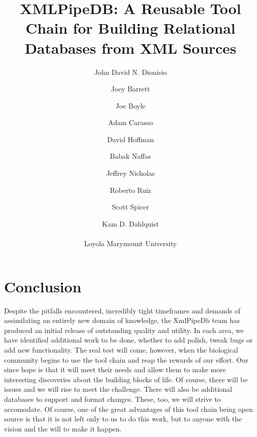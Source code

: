 \documentclass[11pt]{article}
\title{XMLPipeDB: A Reusable Tool Chain for Building Relational Databases from XML Sources}
\author{
John David N. Dionisio \and
Joey Barrett \and
Joe Boyle \and
Adam Carasso \and
David Hoffman \and
Babak Naffas \and
Jeffrey Nicholas \and
Roberto Ruiz \and
Scott Spicer \and
Kam D. Dahlquist\\
\\
Loyola Marymount University
}
\begin{document}
\maketitle




























\section{Conclusion}
Despite the pitfalls encountered, incredibly tight timeframes and demands of assimilating an entirely new domain of knowledge, the XmlPipeDb team has produced an initial release of outstanding quality and utility. In each area, we have identified additional work to be done, whether to add polish, tweak bugs or add new functionality. The real test will come, however, when the biological community begins to use the tool chain and reap the rewards of our effort. Our since hope is that it will meet their needs and allow them to make more interesting discoveries about the building blocks of life. Of course, there will be issues and we will rise to meet the challenge. There will also be additional databases to support and format changes. These, too, we will strive to accomodate. Of course, one of the great advantages of this tool chain being open source is that it is not left only to us to do this work, but to anyone with the vision and the will to make it happen.



\pagebreak


\end{document}
